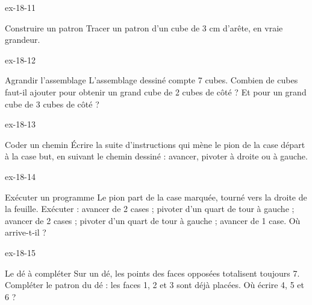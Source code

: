 \begin{blocLivre}{ex-18-11}\begin{exercice}[3]{Construire un patron}
Tracer un patron d’un cube de 3 cm d’arête, en vraie grandeur.
\label{fig-ex-18-11}
\end{exercice}\end{blocLivre}
\begin{blocLivre}{ex-18-12}\begin{exercice}[3]{Agrandir l’assemblage}
L’assemblage dessiné compte 7 cubes. Combien de cubes faut-il ajouter pour obtenir un grand cube de 2 cubes de côté ? Et pour un grand cube de 3 cubes de côté ?
\label{fig-ex-18-12}
\end{exercice}\end{blocLivre}
\begin{blocLivre}{ex-18-13}\begin{exercice}[3]{Coder un chemin}
Écrire la suite d’instructions qui mène le pion de la case départ à la case but, en suivant le chemin dessiné : avancer, pivoter à droite ou à gauche.
\label{fig-ex-18-13}
\end{exercice}\end{blocLivre}
\begin{blocLivre}{ex-18-14}\begin{exercice}[3]{Exécuter un programme}
Le pion part de la case marquée, tourné vers la droite de la feuille. Exécuter : avancer de 2 cases ; pivoter d’un quart de tour à gauche ; avancer de 2 cases ; pivoter d’un quart de tour à gauche ; avancer de 1 case. Où arrive-t-il ?
\label{fig-ex-18-14}
\end{exercice}\end{blocLivre}
\begin{blocLivre}{ex-18-15}\begin{exercice}[3]{Le dé à compléter}
Sur un dé, les points des faces opposées totalisent toujours 7. Compléter le patron du dé : les faces 1, 2 et 3 sont déjà placées. Où écrire 4, 5 et 6 ?
\label{fig-ex-18-15}
\end{exercice}\end{blocLivre}

\clearpage
